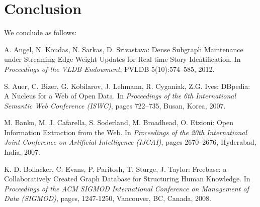 \documentclass[11pt,a4paper]{article}
\begin{document}
\section{Conclusion}
We conclude as follows:


\begin{thebibliography}{99}

 A. Angel, N. Koudas, N. Sarkas, D. Srivastava: Dense Subgraph Maintenance under Streaming Edge Weight Updates for Real-time Story Identification. In \textit{Proceedings of the VLDB Endowment}, PVLDB 5(10):574--585, 2012.

 S. Auer, C. Bizer, G. Kobilarov, J. Lehmann, R. Cyganiak, Z.G. Ives: DBpedia: A Nucleus for a Web of Open Data.  In \textit{Proceedings of the 6th International Semantic Web Conference (ISWC)}, pages 722--735, Busan, Korea, 2007.


 M. Banko, M. J. Cafarella, S. Soderland, M. Broadhead, O. Etzioni: Open Information Extraction from the Web. In \textit{Proceedings of the 20th International Joint Conference on Artificial Intelligence (IJCAI)}, pages 2670--2676, Hyderabad, India, 2007.

 K. D. Bollacker, C. Evans, P. Paritosh, T. Sturge, J. Taylor: Freebase: a Collaboratively Created Graph Database for Structuring Human Knowledge.  In \textit{Proceedings of the ACM SIGMOD International Conference on Management of Data (SIGMOD)}, pages, 1247-1250, Vancouver, BC, Canada, 2008.

%
%


\end{thebibliography}
\end{document}
